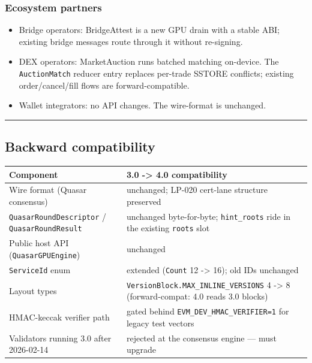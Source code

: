 \documentclass[
]{article}
\newcounter{none} %
\providecommand{\tightlist}{%
  \setlength{\itemsep}{0pt}\setlength{\parskip}{0pt}}
\begin{document}
\subsubsection{Ecosystem partners}\label{ecosystem-partners}

\begin{itemize}
\tightlist
\item
  Bridge operators: BridgeAttest is a new GPU drain with a stable ABI;
  existing bridge messages route through it without re-signing.
\item
  DEX operators: MarketAuction runs batched matching on-device. The
  \texttt{AuctionMatch} reducer entry replaces per-trade SSTORE
  conflicts; existing order/cancel/fill flows are forward-compatible.
\item
  Wallet integrators: no API changes. The wire-format is unchanged.
\end{itemize}

\begin{center}\rule{0.5\linewidth}{0.5pt}\end{center}

\subsection{Backward compatibility}\label{backward-compatibility}

{\def\LTcaptype{none} %
\begin{longtable}[]{@{}ll@{}}
\toprule\noalign{}
Component & 3.0 -\textgreater{} 4.0 compatibility \\
\midrule\noalign{}
\endhead
\bottomrule\noalign{}
\endlastfoot
Wire format (Quasar consensus) & unchanged; LP-020 cert-lane structure
preserved \\
\texttt{QuasarRoundDescriptor} / \texttt{QuasarRoundResult} & unchanged
byte-for-byte; \texttt{hint\_roots} ride in the existing \texttt{roots}
slot \\
Public host API (\texttt{QuasarGPUEngine}) & unchanged \\
\texttt{ServiceId} enum & extended (\texttt{Count} 12 -\textgreater{}
16); old IDs unchanged \\
Layout types & \texttt{VersionBlock.MAX\_INLINE\_VERSIONS} 4
-\textgreater{} 8 (forward-compat: 4.0 reads 3.0 blocks) \\
HMAC-keccak verifier path & gated behind
\texttt{EVM\_DEV\_HMAC\_VERIFIER=1} for legacy test vectors \\
Validators running 3.0 after 2026-02-14 & rejected at the consensus
engine --- must upgrade \\
\end{longtable}
}
\end{document}
